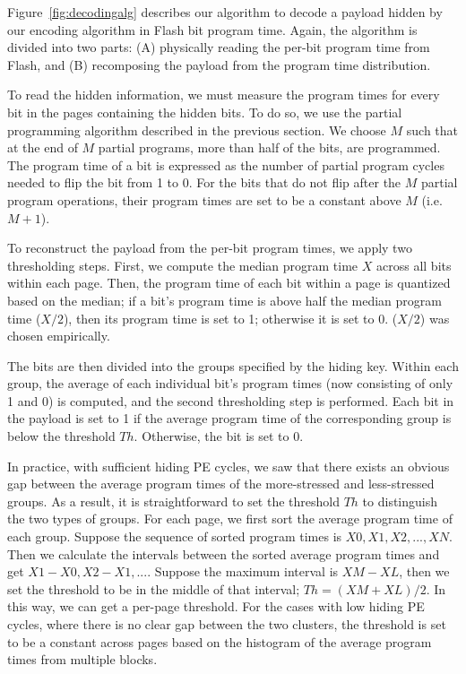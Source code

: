 Figure~\ref{fig:decodingalg} describes our algorithm to decode a payload hidden 
by our encoding algorithm in Flash bit program time. Again, the algorithm is divided into
two parts: (A) physically reading the per-bit program time from Flash, and (B) recomposing
the payload from the program time distribution.

To read the hidden information, we must measure the program times for every bit in the pages
containing the hidden bits. To do so, we use the partial programming algorithm described 
in the previous section. We choose $M$ such that at the end of $M$ partial programs, 
more than half of the bits, are programmed.
The program time of a bit is expressed as the number of partial program cycles needed to 
flip the bit from 1 to 0. 
For the bits that do not flip after the $M$ partial program operations, their program
times are set to be a constant above $M$ (i.e. $M+1$). 

To reconstruct the payload from the per-bit program times, we apply two thresholding steps. 
First, we compute the median program time $X$ across all bits within each page.
Then, the program time of each bit within a page is quantized based on the median;
if a bit's program time is above half the median
program time ($X/2$), then its program time is set to 1; otherwise it is set to 0.
($X/2$) was chosen empirically.

The bits are then divided into the groups specified by the hiding key. Within each group, 
the average of each individual bit's program times (now consisting of only 1 and 0) is 
computed, and the second thresholding step
is performed. Each bit in the payload is set to 1 if the average program time
of the corresponding group is below the threshold $Th$. Otherwise, the bit is set to 0.

In practice, with sufficient hiding PE cycles, we saw that there exists an obvious gap 
between the average program times of the more-stressed and less-stressed groups. 
As a result, it is straightforward to set the threshold $Th$ to distinguish the
two types of groups. For each page, we first sort the average program time of each
group. Suppose the sequence of sorted program times is $X0, X1, X2, ..., XN$. Then 
we calculate the intervals between the sorted average program times and get $X1-X0, X2-X1, ...$.
Suppose the maximum interval is $XM-XL$, then we set the threshold to be in the middle of that
interval; $Th = (XM+XL)/2$. In this way, we can get a per-page threshold. 
For the cases with low hiding PE cycles, where there is no clear gap between the two
clusters, the threshold is set to be a constant across pages based on the histogram
of the average program times from multiple blocks. 
 
